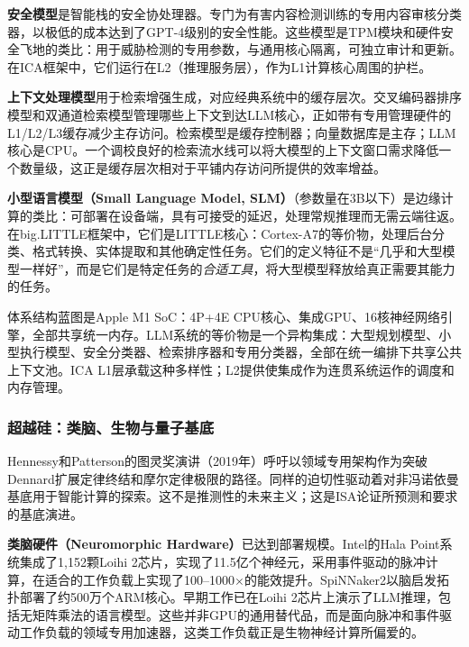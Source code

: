 \textbf{安全模型}是智能栈的安全协处理器。专门为有害内容检测训练的专用内容审核分类器，以极低的成本达到了GPT-4级别的安全性能\cite{harmbench_2024, airbench_2024}。这些模型是TPM模块和硬件安全飞地的类比：用于威胁检测的专用参数，与通用核心隔离，可独立审计和更新。在ICA框架中，它们运行在L2（推理服务层），作为L1计算核心周围的护栏。

\textbf{上下文处理模型}用于检索增强生成，对应经典系统中的缓存层次。交叉编码器排序模型和双通道检索模型管理哪些上下文到达LLM核心，正如带有专用管理硬件的L1/L2/L3缓存减少主存访问\cite{slm_edge_2025}。检索模型是缓存控制器；向量数据库是主存；LLM核心是CPU。一个调校良好的检索流水线可以将大模型的上下文窗口需求降低一个数量级，这正是缓存层次相对于平铺内存访问所提供的效率增益。

\textbf{小型语言模型（Small Language Model, SLM）}（参数量在3B以下）是边缘计算的类比：可部署在设备端，具有可接受的延迟，处理常规推理而无需云端往返\cite{llama32_2024, phi3_2024}。在big.LITTLE框架中，它们是LITTLE核心：Cortex-A7的等价物，处理后台分类、格式转换、实体提取和其他确定性任务。它们的定义特征不是``几乎和大型模型一样好''，而是它们是特定任务的\textit{合适工具}，将大型模型释放给真正需要其能力的任务。

体系结构蓝图是Apple M1 SoC：4P+4E CPU核心、集成GPU、16核神经网络引擎，全部共享统一内存\cite{apple_m1_2020}。LLM系统的等价物是一个异构集成：大型规划模型、小型执行模型、安全分类器、检索排序器和专用分类器，全部在统一编排下共享公共上下文池。ICA L1层承载这种多样性；L2提供使集成作为连贯系统运作的调度和内存管理。

\subsubsection{超越硅：类脑、生物与量子基底}

Hennessy和Patterson的图灵奖演讲（2019年）呼吁以领域专用架构作为突破Dennard扩展定律终结和摩尔定律极限的路径\cite{hennessy_patterson_2019}。同样的迫切性驱动着对非冯诺依曼基底用于智能计算的探索。这不是推测性的未来主义；这是ISA论证所预测和要求的基底演进。

\textbf{类脑硬件（Neuromorphic Hardware）}已达到部署规模。Intel的Hala Point系统集成了1,152颗Loihi 2芯片，实现了11.5亿个神经元，采用事件驱动的脉冲计算，在适合的工作负载上实现了100--1000$\times$的能效提升\cite{hala_point_2024}。SpiNNaker2以脑启发拓扑部署了约500万个ARM核心\cite{spinnaker2_2024}。早期工作已在Loihi 2芯片上演示了LLM推理，包括无矩阵乘法的语言模型\cite{abreu_2025_loihi2_llm}。这些并非GPU的通用替代品，而是面向脉冲和事件驱动工作负载的领域专用加速器，这类工作负载正是生物神经计算所偏爱的。

